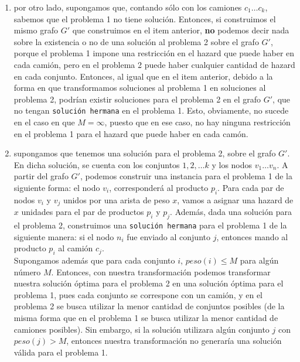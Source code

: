 \documentclass[11pt, a4paper, twoside]{article}
\begin{document}
\begin{enumerate}
\begin{enumerate}
			      \item por otro lado, supongamos que, contando sólo con los camiones $c_{1} \dots c_{k}$, sabemos
			      que el problema 1 no tiene solución. Entonces, si construimos el mismo grafo $G'$ que construimos
			      en el item anterior, \textbf{no} podemos decir nada sobre la existencia o no de una solución
			      al problema 2 sobre el grafo $G'$, porque el problema 1 impone una restricción en el hazard que
			      puede haber en cada camión, pero en el problema 2 puede haber cualquier cantidad de hazard en cada
			      conjunto. Entonces, al igual que en el item anterior, debido a la forma en que transformamos soluciones
			      al problema 1 en soluciones al problema 2, podrían existir soluciones para el problema 2
			      en el grafo $G'$, que no tengan \texttt{solución hermana} en el problema 1. Esto, obviamente, no sucede
			      en el caso en que $M = \infty$, puesto que en ese caso, no hay ninguna restricción en el problema 1
			      para el hazard que puede haber en cada camón. 
			      
			      \item supongamos que tenemos una solución para el problema 2, sobre el grafo $G'$. En dicha 
			      solución, se cuenta con
			      los conjuntos $1, 2, \dots k$ y los nodos $v_{1} \dots v_{n}$. A partir del grafo $G'$, podemos
			      construir una instancia para el problema 1 de la siguiente forma: el nodo $v_{i}$, corresponderá
			      al producto $p_{i}$. Para cada par de nodos $v_{i}$ y $v_{j}$ unidos por una arista de peso $x$,
			      vamos a asignar una hazard de $x$ unidades para el par de productos $p_{i}$ y $p_{j}$. Además,
			      dada una solución para el problema 2, construimos una \texttt{solución hermana} para el problema 1
			      de la siguiente manera: si el nodo $n_{i}$ fue enviado al conjunto $j$, entonces mando al producto
			      $p_{i}$ al camión $c_{j}$. \\
			      Supongamos además que para cada conjunto $i$, $peso(i) \leq M$ para algún número $M$. Entonces, 
			      con nuestra transformación podemos transformar nuestra solución óptima para el problema 2 en una solución
			      óptima para el problema 1, pues cada conjunto se correspone con un camión, y en el problema 2 se busca
			      utilizar la menor cantidad de conjuntos posibles (de la misma forma que en el problema 1 se busca
			      utilizar la menor cantidad de camiones posibles). Sin embargo, si la solución utilizara algún
			      conjunto $j$ con $peso(j) > M$, entonces
			      nuestra transformación no generaría una solución válida para el problema 1.
			    

\end{enumerate}
\end{enumerate}
\end{document}
